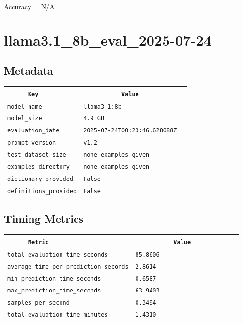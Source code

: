\documentclass{article}
\begin{document}
\begin{center}
Accuracy = N/A
\end{center}

\section{llama3.1\_8b\_eval\_2025-07-24}
\subsection{Metadata}

\begin{center}
\begin{tabular}{l | l} \hline
    \verb|      Key      | & \verb|           Value           | \\ \hline
    \hline
    \verb|model_name    | & \verb|llama3.1:8b                  | \\ \hline
    \verb|model_size    | & \verb|4.9 GB                       | \\ \hline
    \verb|evaluation_date| & \verb|2025-07-24T00:23:46.628088Z  | \\ \hline
    \verb|prompt_version| & \verb|v1.2                         | \\ \hline
    \verb|test_dataset_size| & \verb|none examples given          | \\ \hline
    \verb|examples_directory| & \verb|none examples given          | \\ \hline
    \verb|dictionary_provided| & \verb|False                        | \\ \hline
    \verb|definitions_provided| & \verb|False                        | \\ \hline
\end{tabular}
\end{center}

\subsection{Timing Metrics}

\begin{center}
\begin{tabular}{l | l} \hline
    \verb|      Metric     | & \verb|           Value           | \\ \hline
    \hline
    \verb|total_evaluation_time_seconds| & \verb|85.8606                      | \\ \hline
    \verb|average_time_per_prediction_seconds| & \verb|2.8614                       | \\ \hline
    \verb|min_prediction_time_seconds| & \verb|0.6587                       | \\ \hline
    \verb|max_prediction_time_seconds| & \verb|63.9403                      | \\ \hline
    \verb|samples_per_second| & \verb|0.3494                       | \\ \hline
    \verb|total_evaluation_time_minutes| & \verb|1.4310                       | \\ \hline
\end{tabular}
\end{center}
\end{document}
